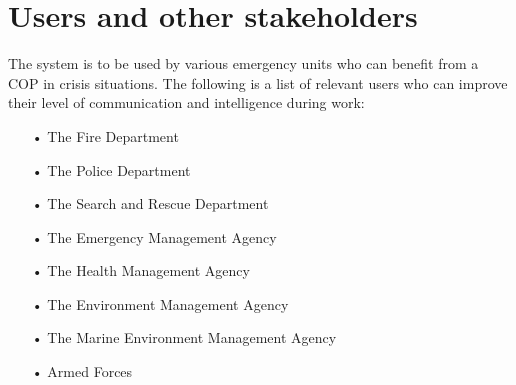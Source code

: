 \section{Users and other stakeholders}
The system is to be used by various emergency units who can benefit from a COP in crisis situations. The following is a list of relevant users who can improve their level of communication and intelligence during work:

\begin{enumerate}
\item[•] The Fire Department
\item[•] The Police Department
\item[•] The Search and Rescue Department
\item[•] The Emergency Management Agency
\item[•] The Health Management Agency
\item[•] The Environment Management Agency
\item[•] The Marine Environment Management Agency
\item[•] Armed Forces
\end{enumerate}

